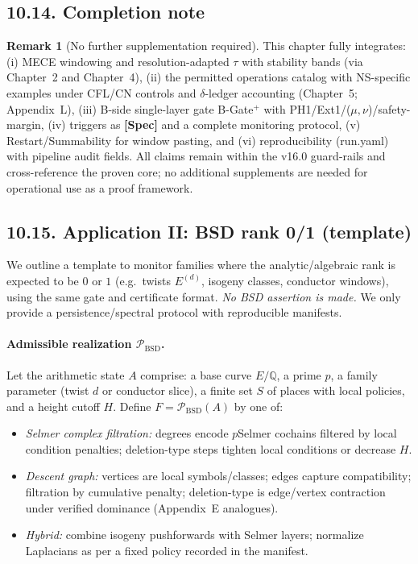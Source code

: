 \documentclass[11pt]{article}
\numberwithin{equation}{section}
\theoremstyle{plain}
\theoremstyle{definition}
\theoremstyle{remark}
\DeclareRobustCommand{\hyp}{\nobreakdash-}
\theoremstyle{plain}
\theoremstyle{definition}
\numberwithin{equation}{section}
\theoremstyle{definition}
\newtheorem{remark}[theorem]{Remark}
\numberwithin{equation}{section}
\theoremstyle{plain}
\theoremstyle{definition}
\theoremstyle{remark}
\begin{document}
\subsection*{10.14. Completion note}
\begin{remark}[No further supplementation required]
This chapter fully integrates: (i) MECE windowing and resolution\hyp adapted \(\tau\) with stability bands (via Chapter~2 and Chapter~4), (ii) the permitted operations catalog with NS\hyp specific examples under CFL/CN controls and \(\delta\)\hyp ledger accounting (Chapter~5; Appendix~L), (iii) B\hyp side single\hyp layer gate B\hyp Gate\(^{+}\) with PH1/Ext1/(\(\mu,\nu\))/safety\hyp margin, (iv) triggers as \textbf{[Spec]} and a complete monitoring protocol, (v) Restart/Summability for window pasting, and (vi) reproducibility (run.yaml) with pipeline audit fields. All claims remain within the v16.0 guard\hyp rails and cross\hyp reference the proven core; no additional supplements are needed for operational use as a proof framework.
\end{remark}


\subsection*{10.15. Application II: BSD rank 0/1 (template)}
We outline a template to monitor families where the analytic/algebraic rank is expected to be \(0\) or \(1\) (e.g.\ twists \(E^{(d)}\), isogeny classes, conductor windows), using the same gate and certificate format. \emph{No BSD assertion is made.} We only provide a persistence/spectral protocol with reproducible manifests.

\paragraph{Admissible realization \(\mathcal{P}_{\mathrm{BSD}}\).}
Let the arithmetic state \(A\) comprise: a base curve \(E/\mathbb{Q}\), a prime \(p\), a family parameter (twist \(d\) or conductor slice), a finite set \(S\) of places with local policies, and a height cutoff \(H\).
Define \(F=\mathcal{P}_{\mathrm{BSD}}(A)\) by one of:
\begin{itemize}
  \item \emph{Selmer complex filtration:} degrees encode \(p\)\nobreakdash Selmer cochains filtered by local condition penalties; deletion\hyp type steps tighten local conditions or decrease \(H\).
  \item \emph{Descent graph:} vertices are local symbols/classes; edges capture compatibility; filtration by cumulative penalty; deletion\hyp type is edge/vertex contraction under verified dominance (Appendix~E analogues).
  \item \emph{Hybrid:} combine isogeny pushforwards with Selmer layers; normalize Laplacians as per a fixed policy recorded in the manifest.
\end{itemize}
\end{document}
